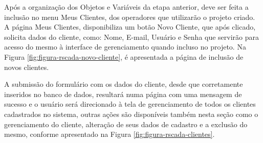     	\begin{figure}[!h]
    	\end{figure}

Após a organização dos Objetos e Variáveis da etapa anterior, deve ser feita a inclusão no menu Meus Clientes, dos operadores que utilizarão o projeto criado. A página Meus Clientes, disponibiliza um botão Novo Cliente, que após clicado, solicita dados do cliente, como: Nome, E-mail, Usuário e Senha que servirão para acesso do mesmo à interface de gerenciamento quando incluso no projeto. Na Figura \ref{fig:figura-rscada-novo-cliente}, é apresentada a página de inclusão de novos clientes.

        \begin{figure}[!h]
    	\end{figure}
    	
\quad

\quad
    	
A submissão do formulário com os dados do cliente, desde que corretamente inseridos no banco de dados, resultará numa página com uma mensagem de sucesso e o usuário será direcionado à tela de gerenciamento de todos os clientes cadastrados no sistema, outras ações são disponíveis também nesta seção como o gerenciamento do cliente, alteração de seus dados de cadastro e a exclusão do mesmo, conforme apresentado na Figura \ref{fig:figura-rscada-clientes}.
    	
